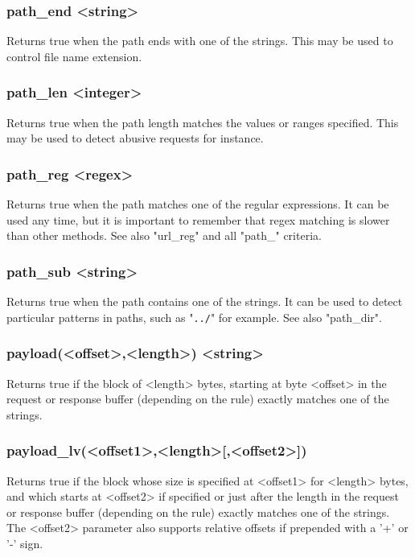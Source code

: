 \subsubsection[path\_end]{path\_end <string>}
  Returns true when the path ends with one of the strings. This may be used to
  control file name extension.

\subsubsection[path\_len]{path\_len <integer>}
  Returns true when the path length matches the values or ranges specified.
  This may be used to detect abusive requests for instance.

\subsubsection[path\_reg]{path\_reg <regex>}
  Returns true when the path matches one of the regular expressions. It can be
  used any time, but it is important to remember that regex matching is slower
  than other methods. See also "url\_reg" and all "path\_" criteria.

\subsubsection[path\_sub]{path\_sub <string>}
  Returns true when the path contains one of the strings. It can be used to
  detect particular patterns in paths, such as "\verb|../|" for example. See also
  "path\_dir".

\subsubsection[payload]{payload(<offset>,<length>) <string>}
  Returns true if the block of <length> bytes, starting at byte <offset> in the
  request or response buffer (depending on the rule) exactly matches one of the
  strings.

\subsubsection[payload\_lv]{payload\_lv(<offset1>,<length>[,<offset2>])}
  Returns true if the block whose size is specified at <offset1> for <length>
  bytes, and which starts at <offset2> if specified or just after the length in
  the request or response buffer (depending on the rule) exactly matches one of
  the strings. The <offset2> parameter also supports relative offsets if
  prepended with a '+' or '-' sign.

